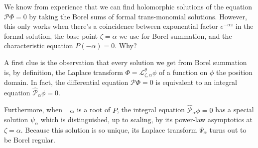 \documentclass{article}
\newcommand{\laplace}{\mathcal{L}}
\theoremstyle{definition}
\theoremstyle{plain}
\begin{document}
We know from experience that we can find holomorphic solutions of the equation $\mathcal{P}\Phi = 0$ by taking the Borel sums of formal trans-monomial solutions. However, this only works when there's a coincidence between exponential factor $e^{-\alpha z}$ in the formal solution, the base point $\zeta = \alpha$ we use for Borel summation, and the characteristic equation $P(-\alpha) = 0$. Why?

A first clue is the observation that every solution we get from Borel summation is, by definition, the Laplace transform $\Phi = \laplace_{\zeta,\alpha}^\theta \phi$ of a function on $\phi$ the position domain. In fact, the differential equation $\mathcal{P}\Phi = 0$ is equivalent to an integral equation $\hat{\mathcal{P}}_\alpha \phi = 0$.

Furthermore, when $-\alpha$ is a root of $P$, the integral equation $\hat{\mathcal{P}}_\alpha \phi = 0$ has a special solution $\psi_\alpha$ which is distinguished, up to scaling, by its power-law asymptotics at $\zeta = \alpha$. Because this solution is so unique, its Laplace transform $\Psi_\alpha$ turns out to be Borel regular.

\end{document}
